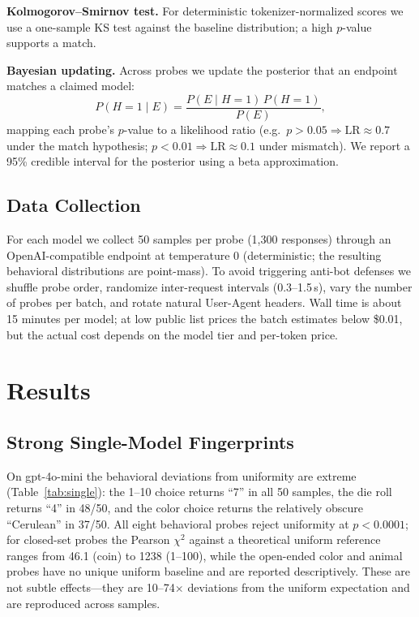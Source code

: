 \documentclass[10pt,twocolumn,letterpaper]{article}
\begin{document}
\textbf{Kolmogorov--Smirnov test.} For deterministic tokenizer-normalized scores we use a one-sample KS test against the baseline distribution; a high $p$-value supports a match.

\textbf{Bayesian updating.} Across probes we update the posterior that an endpoint matches a claimed model:
\begin{equation}
P(H{=}1\mid E) = \frac{P(E\mid H{=}1)\,P(H{=}1)}{P(E)},
\end{equation}
mapping each probe's $p$-value to a likelihood ratio (e.g.\ $p>0.05 \Rightarrow \mathrm{LR}\approx 0.7$ under the match hypothesis; $p<0.01 \Rightarrow \mathrm{LR}\approx 0.1$ under mismatch). We report a 95\% credible interval for the posterior using a beta approximation.

\subsection{Data Collection}
\label{sec:collect}
For each model we collect 50 samples per probe (1{,}300 responses) through an OpenAI-compatible endpoint at temperature 0 (deterministic; the resulting behavioral distributions are point-mass). To avoid triggering anti-bot defenses we shuffle probe order, randomize inter-request intervals (0.3--1.5\,s), vary the number of probes per batch, and rotate natural User-Agent headers. Wall time is about 15 minutes per model; at low public list prices the batch estimates below \$0.01, but the actual cost depends on the model tier and per-token price.

\section{Results}
\label{sec:results}

\subsection{Strong Single-Model Fingerprints}
\label{sec:single}
On gpt-4o-mini the behavioral deviations from uniformity are extreme (Table~\ref{tab:single}): the 1--10 choice returns ``7'' in all 50 samples, the die roll returns ``4'' in 48/50, and the color choice returns the relatively obscure ``Cerulean'' in 37/50. All eight behavioral probes reject uniformity at $p<0.0001$; for closed-set probes the Pearson $\chi^2$ against a theoretical uniform reference ranges from 46.1 (coin) to 1238 (1--100), while the open-ended color and animal probes have no unique uniform baseline and are reported descriptively. These are not subtle effects---they are 10--74$\times$ deviations from the uniform expectation and are reproduced across samples.
\end{document}
